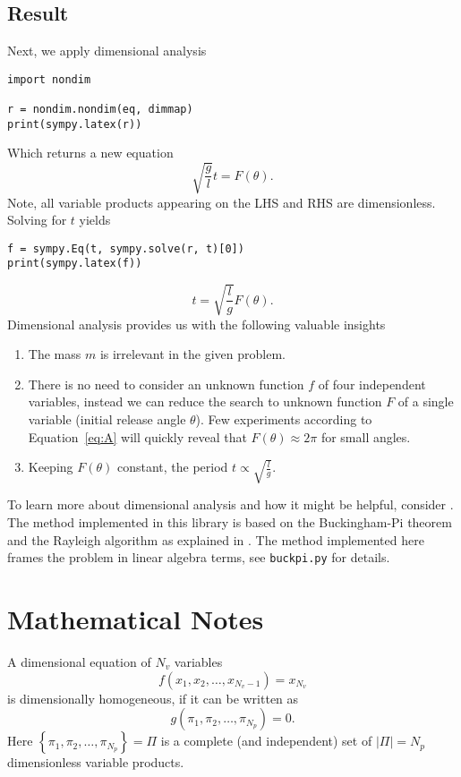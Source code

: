 \documentclass[11pt]{article}
\begin{document}
\subsection{Result}
Next, we apply dimensional analysis
\begin{verbatim}
import nondim

r = nondim.nondim(eq, dimmap)
print(sympy.latex(r))
\end{verbatim}
Which returns a new equation
\begin{equation}
    \sqrt{\frac{g}{l}}t = F{\left(\theta \right)}. \label{eq:A}
\end{equation} Note, all variable products appearing on the LHS and RHS are dimensionless. Solving for $t$ yields
\begin{verbatim}
f = sympy.Eq(t, sympy.solve(r, t)[0])
print(sympy.latex(f))
\end{verbatim}
$$t = \sqrt{\frac{l}{g}}F{\left(\theta \right)}.$$ 
Dimensional analysis provides us with the following valuable insights
\begin{enumerate}
    \item The mass $m$ is irrelevant in the given problem.
    \item There is no need to consider an unknown function $f$ of four independent variables, instead we can reduce the search to unknown function $F$ of a single variable (initial release angle $\theta$). Few experiments according to Equation~\ref{eq:A} will quickly reveal that $F(\theta)\approx 2\pi$ for small angles.
    \item Keeping $F{\left(\theta \right)}$ constant, the period $t \propto  \sqrt{\frac{l}{g}}$.
\end{enumerate}

To learn more about dimensional analysis and how it might be helpful, consider \cite{szirtes2007applied, santiago2019first, sonin2001dimensional, lemons2017student,schetz1999fundamentals}. The method implemented in this library is based on the Buckingham-Pi theorem and the Rayleigh algorithm as explained in \cite{szirtes2007applied}. The method implemented here frames the problem in linear algebra terms, see \texttt{buckpi.py} for details.

\section{Mathematical Notes}
A dimensional equation of $N_v$ variables
\begin{equation}
    f(x_1,x_2,\ldots,x_{N_v-1}) = x_{N_v} \label{eq:fnc}
\end{equation}
is dimensionally homogeneous, if it can be written as
\begin{equation}
    g(\pi_1,\pi_2,\ldots,\pi_{N_p}) = 0.
\end{equation}
Here $\left\{\pi_1,\pi_2,\ldots,\pi_{N_p}\right\} = \Pi$ is a complete (and independent) set of $|\Pi|={N_p}$ dimensionless variable products. 
\end{document}

